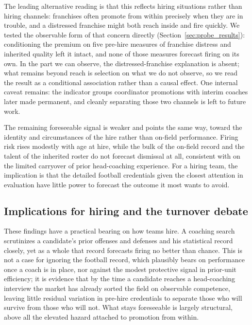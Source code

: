 \documentclass[12pt,USenglish]{article}
\begin{document}
The leading alternative reading is that this reflects hiring situations rather than hiring channels: franchises often promote from within precisely when they are in trouble, and a distressed franchise might both reach inside and fire quickly. We tested the observable form of that concern directly (Section~\ref{sec:probe_results}): conditioning the premium on five pre-hire measures of franchise distress and inherited quality left it intact, and none of those measures forecast firing on its own. In the part we can observe, the distressed-franchise explanation is absent; what remains beyond reach is selection on what we do not observe, so we read the result as a conditional association rather than a causal effect. One internal caveat remains: the indicator groups coordinator promotions with interim coaches later made permanent, and cleanly separating those two channels is left to future work.

The remaining foreseeable signal is weaker and points the same way, toward the identity and circumstances of the hire rather than on-field performance. Firing risk rises modestly with age at hire, while the bulk of the on-field record and the talent of the inherited roster do not forecast dismissal at all, consistent with \citet{roach2016} on the limited carryover of prior head-coaching experience. For a hiring team, the implication is that the detailed football credentials given the closest attention in evaluation have little power to forecast the outcome it most wants to avoid.

\subsection{Implications for hiring and the turnover debate}

These findings have a practical bearing on how teams hire. A coaching search scrutinizes a candidate's prior offenses and defenses and his statistical record closely, yet as a whole that record forecasts firing no better than chance. This is not a case for ignoring the football record, which plausibly bears on performance once a coach is in place, nor against the modest protective signal in prior-unit efficiency; it is evidence that by the time a candidate reaches a head-coaching interview the market has already sorted the field on observable competence, leaving little residual variation in pre-hire credentials to separate those who will survive from those who will not. What stays foreseeable is largely structural, above all the elevated hazard attached to promotion from within.
\end{document}
